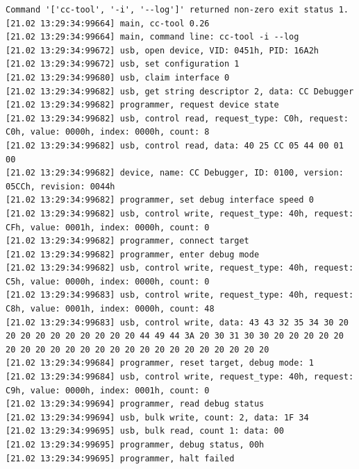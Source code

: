 \begin{verbatim}
Command '['cc-tool', '-i', '--log']' returned non-zero exit status 1.
[21.02 13:29:34:99664] main, cc-tool 0.26
[21.02 13:29:34:99664] main, command line: cc-tool -i --log 
[21.02 13:29:34:99672] usb, open device, VID: 0451h, PID: 16A2h
[21.02 13:29:34:99672] usb, set configuration 1
[21.02 13:29:34:99680] usb, claim interface 0
[21.02 13:29:34:99682] usb, get string descriptor 2, data: CC Debugger
[21.02 13:29:34:99682] programmer, request device state
[21.02 13:29:34:99682] usb, control read, request_type: C0h, request: C0h, value: 0000h, index: 0000h, count: 8
[21.02 13:29:34:99682] usb, control read, data: 40 25 CC 05 44 00 01 00
[21.02 13:29:34:99682] device, name: CC Debugger, ID: 0100, version: 05CCh, revision: 0044h
[21.02 13:29:34:99682] programmer, set debug interface speed 0
[21.02 13:29:34:99682] usb, control write, request_type: 40h, request: CFh, value: 0001h, index: 0000h, count: 0
[21.02 13:29:34:99682] programmer, connect target
[21.02 13:29:34:99682] programmer, enter debug mode
[21.02 13:29:34:99682] usb, control write, request_type: 40h, request: C5h, value: 0000h, index: 0000h, count: 0
[21.02 13:29:34:99683] usb, control write, request_type: 40h, request: C8h, value: 0001h, index: 0000h, count: 48
[21.02 13:29:34:99683] usb, control write, data: 43 43 32 35 34 30 20 20 20 20 20 20 20 20 20 20 44 49 44 3A 20 30 31 30 30 20 20 20 20 20 20 20 20 20 20 20 20 20 20 20 20 20 20 20 20 20 20 20
[21.02 13:29:34:99684] programmer, reset target, debug mode: 1
[21.02 13:29:34:99684] usb, control write, request_type: 40h, request: C9h, value: 0000h, index: 0001h, count: 0
[21.02 13:29:34:99694] programmer, read debug status
[21.02 13:29:34:99694] usb, bulk write, count: 2, data: 1F 34
[21.02 13:29:34:99695] usb, bulk read, count 1: data: 00
[21.02 13:29:34:99695] programmer, debug status, 00h
[21.02 13:29:34:99695] programmer, halt failed
\end{verbatim}
